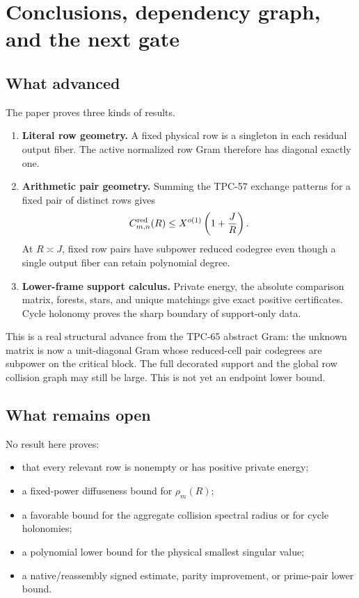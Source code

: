 \section{Conclusions, dependency graph, and the next gate}

\subsection{What advanced}
The paper proves three kinds of results.
\begin{enumerate}[label=(\arabic*)]
\item \textbf{Literal row geometry.} A fixed physical row is a singleton in
each residual output fiber. The active normalized row Gram therefore has
diagonal exactly one.
\item \textbf{Arithmetic pair geometry.} Summing the TPC-57 exchange patterns
for a fixed pair of distinct rows gives
\[
 C_{m,n}^{\rm red}(R)
 \le X^{o(1)}\left(1+\frac JR\right).
\]
At \(R\asymp J\), fixed row pairs have subpower reduced codegree even though a
single output fiber can retain polynomial degree.
\item \textbf{Lower-frame support calculus.} Private energy, the absolute
comparison matrix, forests, stars, and unique matchings give exact positive
certificates. Cycle holonomy proves the sharp boundary of support-only data.
\end{enumerate}

This is a real structural advance from the TPC-65 abstract Gram: the unknown
matrix is now a unit-diagonal Gram whose reduced-cell pair codegrees are
subpower on the critical block. The full decorated support and the global row
collision graph may still be large. This is not yet an endpoint lower bound.

\subsection{What remains open}
No result here proves:
\begin{itemize}
\item that every relevant row is nonempty or has positive private energy;
\item a fixed-power diffuseness bound for \(\rho_m(R)\);
\item a favorable bound for the aggregate collision spectral radius or for
cycle holonomies;
\item a polynomial lower bound for the physical smallest singular value;
\item a native/reassembly signed estimate, parity improvement, or prime-pair
lower bound.
\end{itemize}

